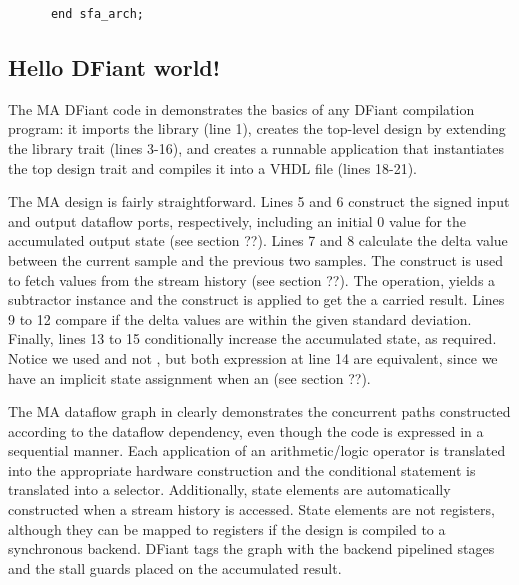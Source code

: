\begin{table}[t!]
\begin{minipage}[t][23cm][t]{0.51\linewidth}
\begin{verbatim}
      end sfa_arch;
    \end{verbatim}
    \label{fig:MAVHDL}
  \end{minipage}
\end{table}

\subsection{Hello DFiant world!}
The MA DFiant code in  demonstrates the basics of any DFiant compilation program: it imports the  library (line 1), creates the top-level design by extending the  library trait (lines 3-16), and creates a runnable application that instantiates the top design trait and compiles it into a VHDL file (lines 18-21). 

The MA design is fairly straightforward. Lines 5 and 6 construct the signed input and output dataflow ports, respectively, including an initial 0 value for the accumulated output state (see section ??). Lines 7 and 8 calculate the delta value between the current sample and the previous two samples. The  construct is used to fetch values from the stream history (see section ??). The \code{-} operation, yields a subtractor instance and the  construct is applied to get the a carried result. Lines 9 to 12 compare if the delta values are within the given standard deviation. Finally, lines 13 to 15 conditionally increase the accumulated state, as required. Notice we used  and not , but both expression at line 14 are equivalent, since we have an implicit state assignment  when an (see section ??). 

The MA dataflow graph in  clearly demonstrates the concurrent paths constructed according to the dataflow dependency, even though the code is expressed in a sequential manner. Each application of an arithmetic/logic operator is translated into the appropriate hardware construction and the conditional  statement is translated into a selector. Additionally, state elements are automatically constructed when a stream history is accessed. State elements are not registers, although they can be mapped to registers if the design is compiled to a synchronous backend. DFiant tags the graph with the backend pipelined stages and the stall guards placed on the accumulated result.

